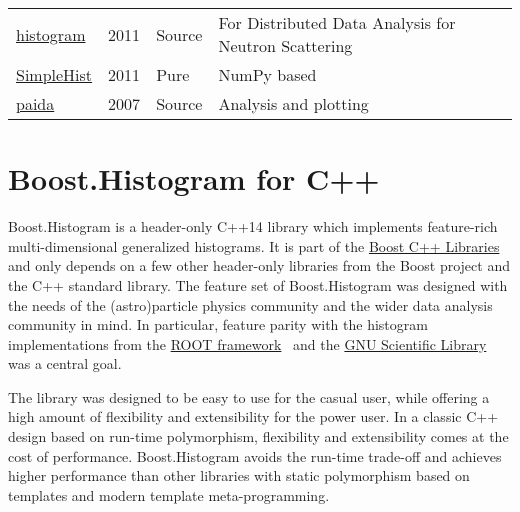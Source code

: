 \documentclass{webofc}
\begin{document}
\begin{table}[h]
\begin{tabular}{llll}
		\href{https://pypi.org/project/histogram}{histogram}                         & 2011         & Source & For Distributed Data Analysis for Neutron Scattering \\
		\href{https://pypi.org/project/SimpleHist/}{SimpleHist}                      & 2011         & Pure   & NumPy based                                          \\
		\href{https://pypi.org/project/paida/}{paida}                                & 2007         & Source & Analysis and plotting                                \\ \hline
	\end{tabular}
\end{table}


\section{Boost.Histogram for C++}
\label{sec-bh-cpp}

%

Boost.Histogram is a header-only C++14 library which implements feature-rich multi-dimensional generalized histograms. It is part of the \href{https://www.boost.org/}{Boost C++ Libraries} and only depends on a few other header-only libraries from the Boost project and the C++ standard library. The feature set of Boost.Histogram was designed with the needs of the (astro)particle physics community and the wider data analysis community in mind. In particular, feature parity with the histogram implementations from the \href{https://root.cern.ch/}{ROOT framework}~\cite{Brun:1997pa} and the \href{https://www.gnu.org/software/gsl/}{GNU Scientific Library}~\cite{gough2009gnu} was a central goal.

The library was designed to be easy to use for the casual user, while offering a high amount of flexibility and extensibility for the power user. In a classic C++ design based on run-time polymorphism, flexibility and extensibility comes at the cost of performance. Boost.Histogram avoids the run-time trade-off and achieves higher performance than other libraries with static polymorphism based on templates and modern template meta-programming.
\end{document}
